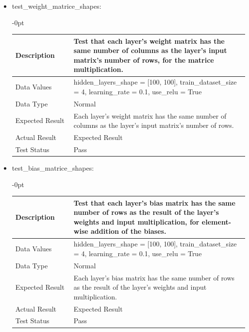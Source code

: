 \documentclass[./project-report/src/latex/project-report.tex]{subfiles}
\begin{document}
\begin{itemize}
\begin{itemize}
\begin{itemize}
					\vspace{5mm}

					\item test\_weight\_matrice\_shapes: \newline
					\begin{adjustwidth}{-\leftmargin}{0pt}
					\begin{tabular}{|p{0.25\linewidth}|p{0.75\linewidth}|}
						\hline
						Description & Test that each layer's weight matrix has the same number of columns as the layer's input matrix's number of rows, for the matrice multiplication. \\
						\hline
						Data Values & hidden\_layers\_shape = [100, 100], \newline
							train\_dataset\_size = 4, \newline
							learning\_rate = 0.1, \newline
							use\_relu = True \\
						\hline
						Data Type & Normal \\
						\hline
						Expected Result & Each layer's weight matrix has the same number of columns as the layer's input matrix's number of rows. \\
						\hline
						Actual Result & Expected Result \\
						\hline
						Test Status & Pass \\
						\hline
					\end{tabular}
					\end{adjustwidth}

					\vspace{5mm}

					\item test\_bias\_matrice\_shapes: \newline
					\begin{adjustwidth}{-\leftmargin}{0pt}
					\begin{tabular}{|p{0.25\linewidth}|p{0.75\linewidth}|}
						\hline
						Description & Test that each layer's bias matrix has the same number of rows as the result of the layer's weights and input multiplication, for element-wise addition of the biases. \\
						\hline
						Data Values & hidden\_layers\_shape = [100, 100], \newline
							train\_dataset\_size = 4, \newline
							learning\_rate = 0.1, \newline
							use\_relu = True \newline \\
						\hline
						Data Type & Normal \\
						\hline
						Expected Result & Each layer's bias matrix has the same number of rows as the result of the layer's weights and input multiplication. \\
						\hline
						Actual Result & Expected Result \\
						\hline
						Test Status & Pass \\
						\hline
					\end{tabular}
					\end{adjustwidth}


\end{itemize}
\end{itemize}
\end{itemize}
\end{document}
